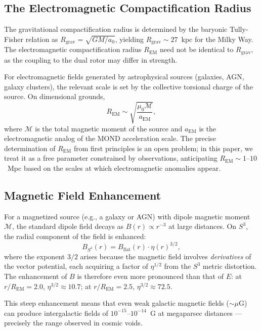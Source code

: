 \documentclass[a4paper]{article}
\begin{document}
\subsection{The Electromagnetic Compactification Radius}

The gravitational compactification radius is determined by the baryonic
Tully-Fisher relation as $R_{\text{grav}} = \sqrt{GM/a_0}$, yielding
$R_{\text{grav}} \sim 27$~kpc for the Milky Way. The electromagnetic
compactification radius $R_{\text{EM}}$ need not be identical to
$R_{\text{grav}}$, as the coupling to the dual rotor may differ in strength.

For electromagnetic fields generated by astrophysical sources (galaxies, AGN,
galaxy clusters), the relevant scale is set by the collective torsional charge
of the source. On dimensional grounds,
\begin{equation}
\label{eq:R_EM}
R_{\text{EM}} \sim \sqrt{\frac{\mu_0 \mathcal{M}}{a_{\text{EM}}}},
\end{equation}
where $\mathcal{M}$ is the total magnetic moment of the source and
$a_{\text{EM}}$ is the electromagnetic analog of the MOND acceleration scale.
The precise determination of $R_{\text{EM}}$ from first principles is an open
problem; in this paper, we treat it as a free parameter constrained by
observations, anticipating $R_{\text{EM}} \sim 1$--$10$~Mpc based on the scales
at which electromagnetic anomalies appear.

\subsection{Magnetic Field Enhancement}

For a magnetized source (e.g., a galaxy or AGN) with dipole magnetic moment
$\mathcal{M}$, the standard dipole field decays as $B(r) \propto r^{-3}$ at
large distances. On $S^3$, the radial component of the field is enhanced:
\begin{equation}
\label{eq:B-enhanced}
B_{S^3}(r) = B_{\text{flat}}(r) \cdot \eta(r)^{3/2},
\end{equation}
where the exponent $3/2$ arises because the magnetic field involves
\emph{derivatives} of the vector potential, each acquiring a factor of
$\eta^{1/2}$ from the $S^3$ metric distortion. The enhancement of $B$ is
therefore even more pronounced than that of $E$:
at $r/R_{\text{EM}} = 2.0$, $\eta^{3/2} \approx 10.7$; at
$r/R_{\text{EM}} = 2.5$, $\eta^{3/2} \approx 72.5$.

This steep enhancement means that even weak galactic magnetic fields
($\sim \mu$G) can produce intergalactic fields of $10^{-15}$--$10^{-14}$~G at
megaparsec distances --- precisely the range observed in cosmic voids.
\end{document}
